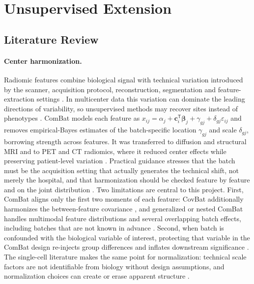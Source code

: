 
\section{Unsupervised Extension}
\label{sec:unsupervised-extension}

\subsection{Literature Review}
\label{sec:ue-literature}

\paragraph{Center harmonization.}
Radiomic features combine biological signal with technical variation
introduced by the scanner, acquisition protocol, reconstruction, segmentation
and feature-extraction settings \citep{mali2021radiomics}. In multicenter data
this variation can dominate the leading directions of variability, so
unsupervised methods may recover sites instead of phenotypes
\citep{fortin2018cortical,leek2010tackling}. ComBat \citep{johnson2007combat}
models each feature as $x_{ij}=\alpha_j+\mathbf{c}_i^{\mathsf T}\boldsymbol\beta_j
+\gamma_{gj}+\delta_{gj}\varepsilon_{ij}$ and removes empirical-Bayes
estimates of the batch-specific location $\gamma_{gj}$ and scale
$\delta_{gj}$, borrowing strength across features. It was transferred to
diffusion and structural MRI \citep{fortin2017dti,fortin2018cortical} and to
PET and CT radiomics, where it reduced center effects while preserving
patient-level variation
\citep{orlhac2018postreconstruction,daano2020combat,masson2021harmonization}.
Practical guidance stresses that the batch must be the acquisition setting
that actually generates the technical shift, not merely the hospital, and
that harmonization should be checked feature by feature and on the joint
distribution \citep{orlhac2022guide}. Two limitations are central to this
project. First, ComBat aligns only the first two moments of each feature:
CovBat additionally harmonizes the between-feature covariance
\citep{chen2022covbat}, and generalized or nested ComBat handles multimodal
feature distributions and several overlapping batch effects, including
batches that are not known in advance \citep{horng2022generalized}. Second,
when batch is confounded with the biological variable of interest, protecting
that variable in the ComBat design re-injects group differences and inflates
downstream significance \citep{nygaard2016methods}. The single-cell
literature makes the same point for normalization: technical
scale factors are not identifiable from biology without design assumptions,
and normalization choices can create or erase apparent structure
\citep{vallejos2017normalizing}.

